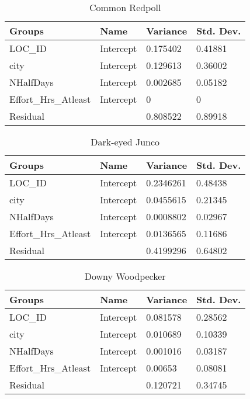 \begin{longtable}[c]{|l|l|l|l|}
\caption{Common Redpoll}
\label{my-label}\\
\hline
Groups               & Name      & Variance & Std. Dev. \\ \hline
\endhead
%
LOC\_ID              & Intercept & 0.175402 & 0.41881   \\ \hline
city                 & Intercept & 0.129613 & 0.36002   \\ \hline
NHalfDays            & Intercept & 0.002685 & 0.05182   \\ \hline
Effort\_Hrs\_Atleast & Intercept & 0        & 0         \\ \hline
Residual             &           & 0.808522 & 0.89918   \\ \hline
\end{longtable}

\begin{longtable}[c]{|l|l|l|l|}
\caption{Dark-eyed Junco}
\label{my-label}\\
\hline
Groups               & Name      & Variance  & Std. Dev. \\ \hline
\endhead
%
LOC\_ID              & Intercept & 0.2346261 & 0.48438   \\ \hline
city                 & Intercept & 0.0455615 & 0.21345   \\ \hline
NHalfDays            & Intercept & 0.0008802 & 0.02967   \\ \hline
Effort\_Hrs\_Atleast & Intercept & 0.0136565 & 0.11686   \\ \hline
Residual             &           & 0.4199296 & 0.64802   \\ \hline
\end{longtable}

\begin{longtable}[c]{|l|l|l|l|}
\caption{Downy Woodpecker}
\label{my-label}\\
\hline
Groups               & Name      & Variance & Std. Dev. \\ \hline
\endhead
%
LOC\_ID              & Intercept & 0.081578 & 0.28562   \\ \hline
city                 & Intercept & 0.010689 & 0.10339   \\ \hline
NHalfDays            & Intercept & 0.001016 & 0.03187   \\ \hline
Effort\_Hrs\_Atleast & Intercept & 0.00653  & 0.08081   \\ \hline
Residual             &           & 0.120721 & 0.34745   \\ \hline
\end{longtable}

